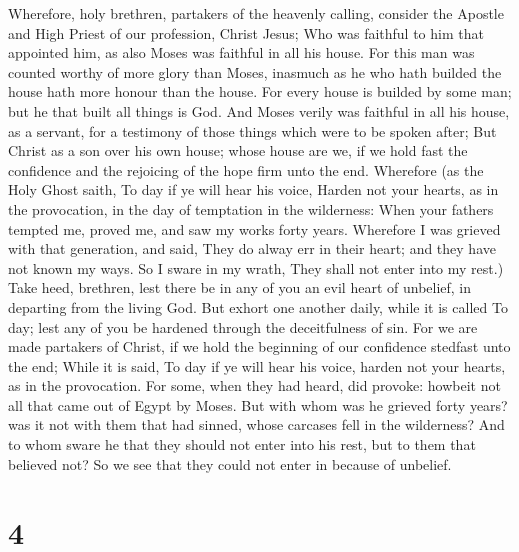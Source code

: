  Wherefore, holy brethren, partakers of the heavenly
calling, consider the Apostle and High Priest of our profession, Christ
Jesus;  Who was faithful to him that appointed him, as
also Moses was faithful in all his house.  For this man
was counted worthy of more glory than Moses, inasmuch as he who hath
builded the house hath more honour than the house.  For
every house is builded by some man; but he that built all things is God.
 And Moses verily was faithful in all his house, as a
servant, for a testimony of those things which were to be spoken after;
 But Christ as a son over his own house; whose house are
we, if we hold fast the confidence and the rejoicing of the hope firm
unto the end.  Wherefore (as the Holy Ghost saith, To day
if ye will hear his voice,  Harden not your hearts, as in
the provocation, in the day of temptation in the wilderness:
 When your fathers tempted me, proved me, and saw my works
forty years.  Wherefore I was grieved with that
generation, and said, They do alway err in their heart; and they have
not known my ways.  So I sware in my wrath, They shall
not enter into my rest.)  Take heed, brethren, lest there
be in any of you an evil heart of unbelief, in departing from the living
God.  But exhort one another daily, while it is called To
day; lest any of you be hardened through the deceitfulness of sin.
 For we are made partakers of Christ, if we hold the
beginning of our confidence stedfast unto the end;  While
it is said, To day if ye will hear his voice, harden not your hearts, as
in the provocation.  For some, when they had heard, did
provoke: howbeit not all that came out of Egypt by Moses.
 But with whom was he grieved forty years? was it not
with them that had sinned, whose carcases fell in the wilderness?
 And to whom sware he that they should not enter into his
rest, but to them that believed not?  So we see that they
could not enter in because of unbelief.

\hypertarget{section-3}{%
\section{4}\label{section-3}}

